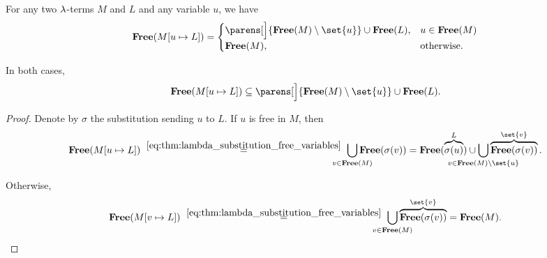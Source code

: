 \begin{corollary}\label{thm:lambda_substitution_free_variables_single}
  For any two \( \mathrm{\lambda} \)-terms \( M \) and \( L \) and any variable \( u \), we have
  \begin{equation}\label{eq:thm:lambda_substitution_free_variables_single}
    \op*{Free}( M[u \mapsto L] ) = \begin{cases}
      \parens[\Big]{ \op*{Free}(M) \setminus \set{ u } } \cup \op*{Free}(L), &u \in \op*{Free}(M) \\
      \op*{Free}(M),                                                         &\T{otherwise.}
    \end{cases}
  \end{equation}

  In both cases,
  \begin{equation}\label{eq:thm:lambda_substitution_free_variables_single/subset}
    \op*{Free}( M[u \mapsto L] ) \subseteq \parens[\Big]{ \op*{Free}(M) \setminus \set{ u } } \cup \op*{Free}(L).
  \end{equation}
\end{corollary}
\begin{proof}
  Denote by \( \sigma \) the substitution sending \( u \) to \( L \). If \( u \) is free in \( M \), then
  \begin{equation*}
    \op*{Free}(M[u \mapsto L])
    \reloset{\eqref{eq:thm:lambda_substitution_free_variables}} =
    \bigcup_{\mathclap{v \in \op*{Free}(M)}} \op*{Free}(\sigma(v))
    =
    \op*{Free}(\overbrace{\sigma(u)}^L) \cup \bigcup_{\mathclap{v \in \op*{Free}(M) \setminus \set{ u }}} \overbrace{\op*{Free}(\sigma(v))}^{\set{ v }}.
  \end{equation*}

  Otherwise,
  \begin{equation*}
    \op*{Free}(M[v \mapsto L])
    \reloset{\eqref{eq:thm:lambda_substitution_free_variables}} =
    \bigcup_{\mathclap{v \in \op*{Free}(M)}} \overbrace{\op*{Free}(\sigma(v))}^{\set{ v }}
    =
    \op*{Free}(M).
  \end{equation*}
\end{proof}

